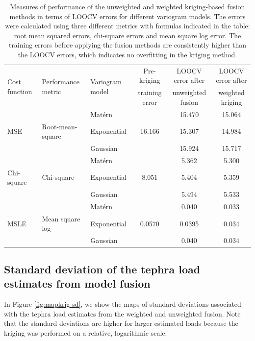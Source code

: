 \documentclass[a4paper,fleqn]{cas-sc}
\begin{document}
    \begin{table}[]
    \caption{Measures of performance of the unweighted and weighted kriging-based fusion methods in terms of LOOCV errors for different variogram models. The errors were calculated using three different metrics with formulas indicated in the table: root mean squared errors, chi-square errors and mean square log error. The training errors before applying the fusion methods are consistently higher than the LOOCV errors, which indicates no overfitting in the kriging method.}
    \label{tab:supp-allvarmods}
    \begin{tabular}{@{}lllccc@{}}
    \toprule
    \multirow{2}{*}{Cost function} &
    \multirow{2}{*}{Performance metric} &
    \multirow{2}{*}{Variogram model} & 
    {Pre-kriging} & 
    LOOCV error after & 
    LOOCV error after \\
        & & &
        training error & 
        unweighted fusion & 
        weighted kriging
    \\ \midrule
     &   & Mat\'ern  &  & 15.470 & 15.064 \\ 
    MSE & Root-mean-square  & Exponential  & 16.166 & 15.307 & 14.984 \\
     &   & Gaussian  &  & 15.924 & 15.717 \\
    \midrule
     &   & Mat\'ern  &  & 5.362 & 5.300 \\
    Chi-square & Chi-square  & Exponential  & 8.051 & 5.404 & 5.359 \\
     &   & Gaussian  &  & 5.494 & 5.533 \\
    \midrule
     &   & Mat\'ern &  & 0.040 & 0.033 \\
    MSLE & Mean square log  & Exponential & 0.0570 & 0.0395 & 0.034 \\
     &   & Gaussian &   & 0.040 & 0.034 \\
    \bottomrule
    \end{tabular}
    \end{table}

\subsection{Standard deviation of the tephra load estimates from model fusion}\label{supp-f}

In Figure \ref{fig:mapkrig-sd}, we show the maps of standard deviations associated with the tephra load estimates from the weighted and unweighted fusion. Note that the standard deviations are higher for larger estimated loads because the kriging was performed on a relative, logarithmic scale.
\end{document}
